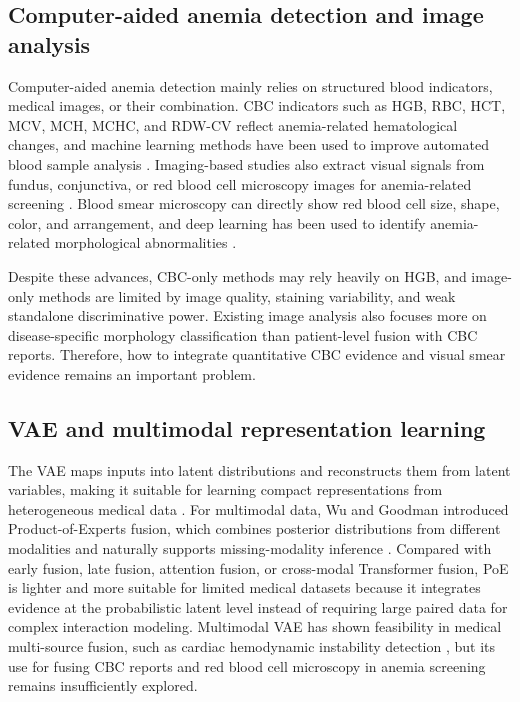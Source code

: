 \documentclass[conference]{IEEEtran}
\begin{document}
\subsection{Computer-aided anemia detection and image analysis}

Computer-aided anemia detection mainly relies on structured blood indicators, medical images, or their combination. CBC indicators such as HGB, RBC, HCT, MCV, MCH, MCHC, and RDW-CV reflect anemia-related hematological changes, and machine learning methods have been used to improve automated blood sample analysis \cite{ref4}. Imaging-based studies also extract visual signals from fundus, conjunctiva, or red blood cell microscopy images for anemia-related screening \cite{ref5}. Blood smear microscopy can directly show red blood cell size, shape, color, and arrangement, and deep learning has been used to identify anemia-related morphological abnormalities \cite{ref6,ref7}.

Despite these advances, CBC-only methods may rely heavily on HGB, and image-only methods are limited by image quality, staining variability, and weak standalone discriminative power. Existing image analysis also focuses more on disease-specific morphology classification than patient-level fusion with CBC reports. Therefore, how to integrate quantitative CBC evidence and visual smear evidence remains an important problem.

\subsection{VAE and multimodal representation learning}

The VAE maps inputs into latent distributions and reconstructs them from latent variables, making it suitable for learning compact representations from heterogeneous medical data \cite{ref8}. For multimodal data, Wu and Goodman introduced Product-of-Experts fusion, which combines posterior distributions from different modalities and naturally supports missing-modality inference \cite{ref9}. Compared with early fusion, late fusion, attention fusion, or cross-modal Transformer fusion, PoE is lighter and more suitable for limited medical datasets because it integrates evidence at the probabilistic latent level instead of requiring large paired data for complex interaction modeling. Multimodal VAE has shown feasibility in medical multi-source fusion, such as cardiac hemodynamic instability detection \cite{ref10}, but its use for fusing CBC reports and red blood cell microscopy in anemia screening remains insufficiently explored.
\end{document}
